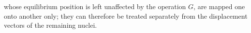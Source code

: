 whose equilibrium position is left unaffected by the operation $G$, are mapped one onto another only; they can therefore be treated separately from the displacement vectors of the remaining nuclei.
